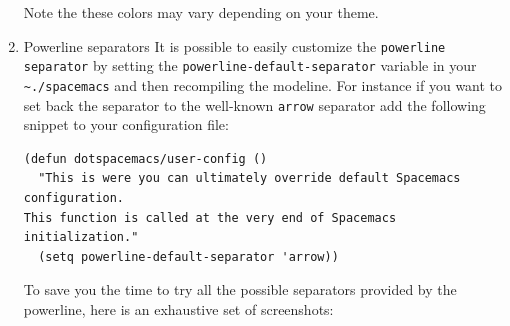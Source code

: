 \documentclass[11pt]{article}
\begin{document}
\begin{enumerate}
Note the these colors may vary depending on your theme.

\item Powerline separators
\label{sec:org85ed33b}
It is possible to easily customize the \texttt{powerline separator} by setting the
\texttt{powerline-default-separator} variable in your \texttt{\textasciitilde{}./spacemacs} and then
recompiling the modeline. For instance if you want to set back the separator to
the well-known \texttt{arrow} separator add the following snippet to your configuration
file:

\begin{verbatim}
(defun dotspacemacs/user-config ()
  "This is were you can ultimately override default Spacemacs configuration.
This function is called at the very end of Spacemacs initialization."
  (setq powerline-default-separator 'arrow))
\end{verbatim}

To save you the time to try all the possible separators provided by the
powerline, here is an exhaustive set of screenshots:


\end{enumerate}
\end{document}
